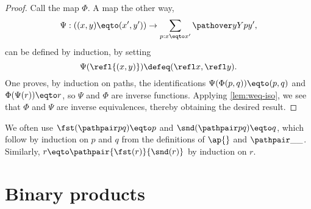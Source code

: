 \begin{proof}
  Call the map $\Phi$.
  A map the other way,
  \[
    \Psi : ((x,y) \eqto (x',y')) \to \sum_{p:x \eqto x'} \pathover y Y p {y'},
  \]
  can be defined by induction, by setting
  \[
    \Psi (\refl {(x,y)}) \defeq (\refl x, \refl y).
  \]
  One proves, by induction on paths, the identifications $ \Psi ( \Phi (p,q) ) \eqto (p,q) $ and $ \Phi (\Psi ( r )) \eqto r$, so $\Psi$ and $\Phi$ are inverse functions.
  Applying \cref{lem:weq-iso}, we see that $\Phi$ and $\Psi$ are inverse equivalences, thereby obtaining the desired result.
\end{proof}

We often use $\fst(\pathpair p q) \eqto p$ and $\snd(\pathpair p q) \eqto q$,
which follow by induction on $p$ and $q$ from the definitions of $\ap{}$ and $\pathpair \_ \_$.
Similarly, $r \eqto \pathpair {\fst(r)}{\snd(r)}$ by induction on $r$.

\section{Binary products}
\label{sec:binprod-types}


